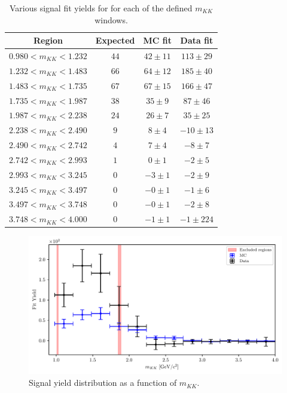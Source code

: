 \begin{table}[H]
	\centering
	\begin{tabular}{c|c|c|c}
		Region & Expected & MC fit & Data fit \\
		\toprule
		$0.980  < m_{KK} < 1.232$ & $44$ & $42 \pm 11$ & $113 \pm 29$ \\
		$1.232  < m_{KK} < 1.483$ & $66$ & $64 \pm 12$ & $185 \pm 40$ \\
		$1.483  < m_{KK} < 1.735$ & $67$ & $67 \pm 15$ & $166 \pm 47$ \\
		$1.735  < m_{KK} < 1.987$ & $38$ & $35 \pm 9$ & $87 \pm 46$ \\
		$1.987  < m_{KK} < 2.238$ & $24$ & $26 \pm 7$ & $35 \pm 25$ \\
		$2.238  < m_{KK} < 2.490$ & $9$ & $8 \pm 4$ & $-10 \pm 13$ \\
		$2.490  < m_{KK} < 2.742$ & $4$ & $7 \pm 4$ & $-8 \pm 7$ \\
		$2.742  < m_{KK} < 2.993$ & $1$ & $0 \pm 1$ & $-2 \pm 5$ \\
		$2.993  < m_{KK} < 3.245$ & $0$ & $-3 \pm 1$ & $-2 \pm 9$ \\
		$3.245  < m_{KK} < 3.497$ & $0$ & $-0 \pm 1$ & $-1 \pm 6$ \\
		$3.497  < m_{KK} < 3.748$ & $0$ & $-0 \pm 1$ & $-2 \pm 8$ \\
		$3.748  < m_{KK} < 4.000$ & $0$ & $-1 \pm 1$ & $-1 \pm 224$ \\
		\bottomrule
	\end{tabular}
	\captionsetup{width=.8\linewidth}
	\caption{Various signal fit yields for for each of the defined $m_{KK}$ windows.}
	\label{tab:mKK_windows}
\end{table}

\begin{figure}[H]
	\centering
	\captionsetup{width=0.8\linewidth}
	\includegraphics[width=\linewidth]{fig/sig_mKK_all}
	\caption{Signal yield distribution as a function of $m_{KK}$.}
	\label{fig:mKK_windows}
\end{figure} 

